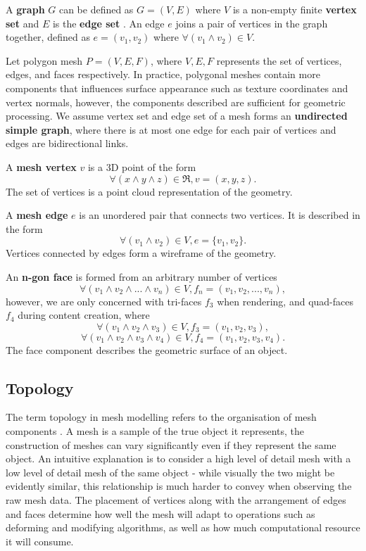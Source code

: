 \documentclass[ %
author={Dillon Keith Diep},
supervisor={Dr. Carl Henrik Ek},
degree={MEng},
title={ART-CG Hair:},
subtitle={Assisted Real-time Content Generation of Stylised Virtual Hair},
type={Research},
year={2017} ]{dissertation}
\begin{document}
A \textbf{graph} $G$ can be defined as $G=(V,E)$ where $V$ is a non-empty finite \textbf{vertex set} and $E$ is the \textbf{edge set} \cite[p.8]{graphtheory}. An edge $e$ joins a pair of vertices in the graph together, defined as $e=(v_1, v_2)$ where $\forall(v_1 \land v_2)\in V$.

Let polygon mesh $P = (V, E, F)$, where $V, E, F$ represents the set of vertices, edges, and faces respectively. In practice, polygonal meshes contain more components that influences surface appearance such as texture coordinates and vertex normals, however, the components described are sufficient for geometric processing. We assume vertex set and edge set of a mesh forms an \textbf{undirected simple graph}, where there is at most one edge for each pair of vertices and edges are bidirectional links.

A \textbf{mesh vertex} $v$ is a 3D point of the form
$$\forall (x \land y \land z) \in \Re, v = (x, y, z).$$
The set of vertices is a point cloud representation of the geometry. 

A \textbf{mesh edge} $e$ is an unordered pair that connects two vertices. It is described in the form
$$\forall (v_1 \land v_2) \in V, e = \{v_1, v_2\}.$$
Vertices connected by edges form a wireframe of the geometry. 

An \textbf{n-gon face} is formed from an arbitrary number of vertices 
$$\forall (v_1 \land v_2 \land ... \land v_n) \in V, f_n = (v_1, v_2,..., v_n),$$ 
however, we are only concerned with tri-faces $f_3$ when rendering, and quad-faces $f_4$ during content creation, where
$$\forall (v_1 \land v_2 \land v_3) \in V, f_3 = (v_1, v_2, v_3),$$
$$\forall (v_1 \land v_2 \land v_3 \land v_4) \in V, f_4 = (v_1, v_2, v_3, v_4).$$
The face component describes the geometric surface of an object.

\subsection{Topology}
The term topology in mesh modelling refers to the organisation of mesh components \cite[p.91]{blenderstudio}. A mesh is a sample of the true object it represents, the construction of meshes can vary significantly even if they represent the same object. An intuitive explanation is to consider a high level of detail mesh with a low level of detail mesh of the same object - while visually the two might be evidently similar, this relationship is much harder to convey when observing the raw mesh data. The placement of vertices along with the arrangement of edges and faces determine how well the mesh will adapt to operations such as deforming and modifying algorithms, as well as how much computational resource it will consume.
\end{document}
